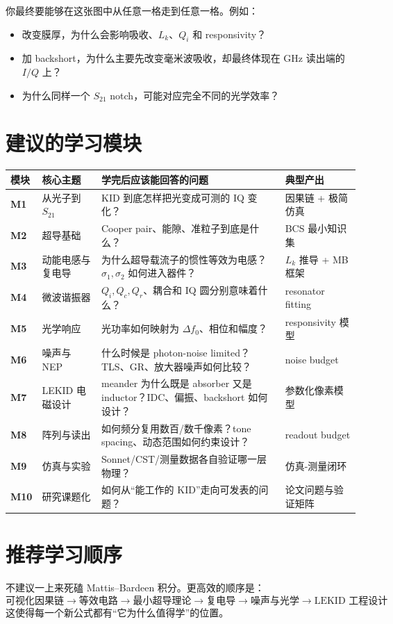 \documentclass[11pt,a4paper,openany]{ctexrep}
\newcommand{\Stwentyone}{S_{21}}
\newcommand{\Lk}{L_k}
\begin{document}
你最终要能够在这张图中从任意一格走到任意一格。例如：
\begin{itemize}
  \item 改变膜厚，为什么会影响吸收、$\Lk$、$Q_i$ 和 responsivity？
  \item 加 backshort，为什么主要先改变毫米波吸收，却最终体现在 GHz 读出端的 $I/Q$ 上？
  \item 为什么同样一个 $\Stwentyone$ notch，可能对应完全不同的光学效率？
\end{itemize}

\section{建议的学习模块}
\renewcommand{\arraystretch}{1.25}
\begin{tabularx}{\textwidth}{>{\bfseries}p{1.5cm} p{4.0cm} X p{2.6cm}}
\toprule
模块 & 核心主题 & 学完后应该能回答的问题 & 典型产出 \\
\midrule
M1 & 从光子到 $\Stwentyone$ & KID 到底怎样把光变成可测的 IQ 变化？ & 因果链 + 极简仿真 \\
M2 & 超导基础 & Cooper pair、能隙、准粒子到底是什么？ & BCS 最小知识集 \\
M3 & 动能电感与复电导 & 为什么超导载流子的惯性等效为电感？$\sigma_1,\sigma_2$ 如何进入器件？ & $L_k$ 推导 + MB 框架 \\
M4 & 微波谐振器 & $Q_i,Q_c,Q_r$、耦合和 IQ 圆分别意味着什么？ & resonator fitting \\
M5 & 光学响应 & 光功率如何映射为 $\Delta f_0$、相位和幅度？ & responsivity 模型 \\
M6 & 噪声与 NEP & 什么时候是 photon-noise limited？TLS、GR、放大器噪声如何比较？ & noise budget \\
M7 & LEKID 电磁设计 & meander 为什么既是 absorber 又是 inductor？IDC、偏振、backshort 如何设计？ & 参数化像素模型 \\
M8 & 阵列与读出 & 如何频分复用数百/数千像素？tone spacing、动态范围如何约束设计？ & readout budget \\
M9 & 仿真与实验 & Sonnet/CST/测量数据各自验证哪一层物理？ & 仿真-测量闭环 \\
M10 & 研究课题化 & 如何从“能工作的 KID”走向可发表的问题？ & 论文问题与验证矩阵 \\
\bottomrule
\end{tabularx}

\section{推荐学习顺序}
不建议一上来死磕 Mattis--Bardeen 积分。更高效的顺序是：
\[
\boxed{
\text{可视化因果链}
\rightarrow
\text{等效电路}
\rightarrow
\text{最小超导理论}
\rightarrow
\text{复电导}
\rightarrow
\text{噪声与光学}
\rightarrow
\text{LEKID 工程设计}
}
\]
这使得每一个新公式都有“它为什么值得学”的位置。
\end{document}
